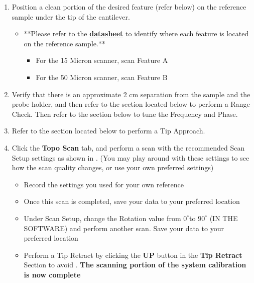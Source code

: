 \documentclass{../lab}
\begin{document}
\begin{enumerate}
    \item Position a clean portion of the desired feature (refer below) on the reference sample under the tip of the cantilever.

    \begin{itemize}
        \item **Please refer to the \href{http://experimentationlab.berkeley.edu/sites/default/files/AFMImages/Reference-\%20sample-SHS-01\_3\_datasheet.pdf}{\textbf{datasheet}} to identify where each feature is located on the reference sample.**

        \begin{itemize}
            \item For the 15 Micron scanner, scan Feature A

            \item For the 50 Micron scanner, scan Feature B

        \end{itemize}

    \end{itemize}

    \item Verify that there is an approximate 2 cm separation from the sample and the probe holder, and then refer to the \textbf{} section located below to perform a Range Check. Then refer to the  section below to tune the Frequency and Phase.

    \item Refer to the  section located below to perform a Tip Approach.

    \item Click the \textbf{Topo Scan }tab, and perform a scan with the recommended Scan Setup settings as shown in . (You may play around with these settings to see how the scan quality changes, or use your own preferred settings)

    \begin{itemize}
        \item Record the settings you used for your own reference

        \item Once this scan is completed, save your data to your preferred location

        \item Under Scan Setup, change the Rotation value from $0^\circ$to $90^\circ$ (IN THE SOFTWARE) and perform another scan.  Save your data to your preferred location

        \item Perform a Tip Retract by clicking the \textbf{UP} button in the \textbf{Tip Retract} Section to avoid \textbf{}.  \textbf{The scanning portion of the system calibration is now complete }

    \end{itemize}

\end{enumerate}
\end{document}

